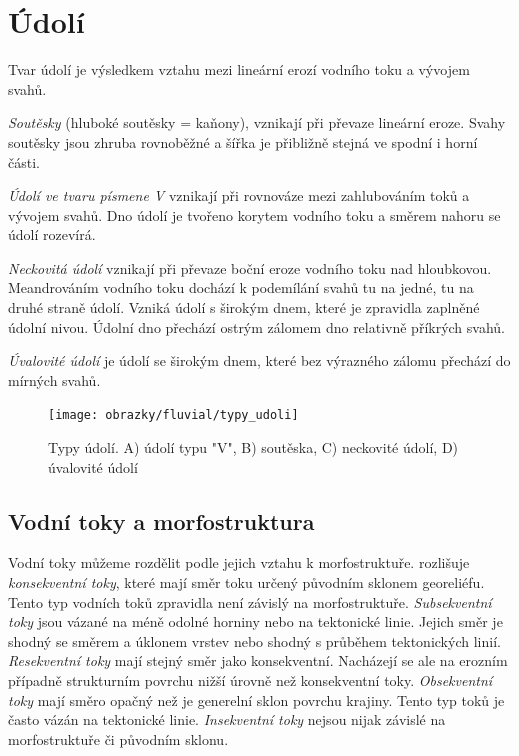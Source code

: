 \section{Údolí}

Tvar údolí je výsledkem vztahu mezi lineární erozí vodního toku a vývojem svahů.

\emph{Soutěsky} (hluboké soutěsky = kaňony), vznikají při převaze lineární eroze. Svahy soutěsky jsou zhruba rovnoběžné a šířka je přibližně stejná ve spodní i horní části.

\emph{Údolí ve tvaru písmene V} vznikají při rovnováze mezi zahlubováním toků a vývojem svahů. Dno údolí je tvořeno korytem vodního toku a směrem nahoru se údolí rozevírá. 

\emph{Neckovitá údolí} vznikají při převaze boční eroze vodního toku nad hloubkovou. Meandrováním vodního toku dochází k podemílání svahů tu na jedné, tu na druhé straně údolí. Vzniká údolí s širokým dnem, které je zpravidla zaplněné údolní nivou. Údolní dno přechází ostrým zálomem dno relativně příkrých svahů. 

\emph{Úvalovité údolí} je údolí se širokým dnem, které bez výrazného zálomu přechází do mírných svahů.

\begin{figure}[h]
	\centering
	\texttt{[image: obrazky/fluvial/typy\_udoli]}
	\caption{Typy údolí. A) údolí typu "V", B) soutěska, C) neckovité údolí, D) úvalovité údolí}
	\label{fig:typyudoli}
\end{figure}

\subsection{Vodní toky a morfostruktura}
Vodní toky můžeme rozdělit podle jejich vztahu k morfostruktuře. \textcite{demekObecnaGeomorfologie1987} rozlišuje \emph{konsekventní toky}, které mají směr toku určený původním sklonem georeliéfu. Tento typ vodních toků zpravidla není závislý na morfostruktuře. \emph{Subsekventní toky} jsou vázané na méně odolné horniny nebo na tektonické linie. Jejich směr je shodný se směrem a úklonem vrstev nebo shodný s průběhem tektonických linií. \emph{Resekventní toky} mají stejný směr jako konsekventní. Nacházejí se ale na erozním případně strukturním povrchu nižší úrovně než konsekventní toky. \emph{Obsekventní toky} mají směro opačný než je generelní sklon povrchu krajiny. Tento typ toků je často vázán na tektonické linie. \emph{Insekventní toky} nejsou nijak závislé na morfostruktuře či původním sklonu.

